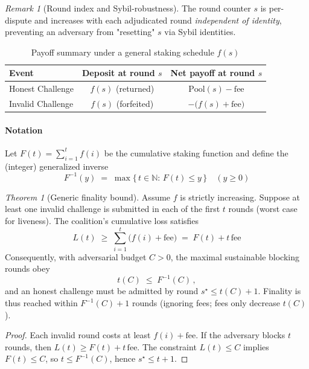 \documentclass[3p]{elsarticle}
\theoremstyle{remark}
\newtheorem*{remark}{Remark}
\newtheorem{theorem}{Theorem}
\begin{document}
\begin{remark}[Round index and Sybil-robustness]
The round counter $s$ is per-dispute and increases with each adjudicated round \emph{independent of identity}, preventing an adversary from "resetting" $s$ via Sybil identities.
\end{remark}

\begin{table}[h]
\centering
\caption{Payoff summary under a general staking schedule $f(s)$}
\renewcommand{\arraystretch}{1.2}
\begin{tabular}{lcc}
\toprule
Event & Deposit at round $s$ & Net payoff at round $s$ \\
\midrule
Honest Challenge & $f(s)$ (returned) & $\mathrm{Pool}(s)-\mathrm{fee}$ \\
Invalid Challenge & $f(s)$ (forfeited) & $-\big(f(s)+\mathrm{fee}\big)$ \\
\bottomrule
\end{tabular}
\label{tab:payoff-fs}
\vspace{-0.6em}
\end{table}

\paragraph{Notation}
Let $F(t)=\sum_{i=1}^{t} f(i)$ be the cumulative staking function and define the (integer) generalized inverse
\[
F^{-1}(y)\;=\;\max\{\,t\in\mathbb{N}:\,F(t)\le y\,\}\quad(y\ge 0)
\]

\begin{theorem}[Generic finality bound]\label{thm:generic-finality}
Assume $f$ is strictly increasing. Suppose at least one invalid challenge is submitted in each of the first $t$ rounds (worst case for liveness). The coalition’s cumulative loss satisfies
\[
L(t)\;\ge\;\sum_{i=1}^{t}\big(f(i)+\mathrm{fee}\big)\;=\;F(t)+t\,\mathrm{fee}
\]
Consequently, with adversarial budget $C>0$, the maximal sustainable blocking rounds obey
\[
t(C)\;\le\;F^{-1}(C)\,,
\]
and an honest challenge must be admitted by round $s^\star\le t(C)+1$. Finality is thus reached within $F^{-1}(C)+1$ rounds (ignoring fees; fees only decrease $t(C)$).
\end{theorem}

\begin{proof}
Each invalid round costs at least $f(i)+\mathrm{fee}$. If the adversary blocks $t$ rounds, then $L(t)\ge F(t)+t\,\mathrm{fee}$. The constraint $L(t)\le C$ implies $F(t)\le C$, so $t\le F^{-1}(C)$, hence $s^\star\le t+1$.
\end{proof}
\end{document}
